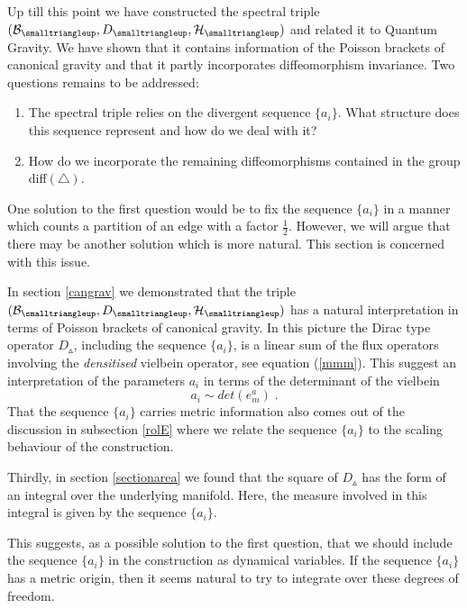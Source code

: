 \documentclass[12pt]{article}
\def\cb{{\cal B}}
\def\ce{{\cal E}}
\def\ch{{\cal H}}
\begin{document}
Up till this point we have constructed the spectral triple $(\cb_{\smalltriangleup},D_{\smalltriangleup},\ch_\smalltriangleup)$ and related it to Quantum Gravity. We have shown that it contains information of the Poisson brackets of canonical gravity and that it partly incorporates diffeomorphism invariance. Two questions remains to be addressed:
\begin{enumerate}
\item
The spectral triple relies on the divergent sequence $\{a_i\}$. What structure does this sequence represent and how do we deal with it?
\item
How do we incorporate the remaining diffeomorphisms contained in the group diff$(\triangle)$.
\end{enumerate}


One solution to the first question would be to fix the sequence $\{a_i\}$ in a manner which counts a partition of an edge with a factor $\frac{1}{2}$. However, we will argue that there may be another solution which is more natural. This section is concerned with this issue.



In section \ref{cangrav} we demonstrated that the triple $(\cb_{\smalltriangleup},D_{\smalltriangleup},\ch_\smalltriangleup)$ has a natural interpretation in terms of Poisson brackets of canonical gravity. In this picture the Dirac type operator $D_{\smalltriangleup}$, including the sequence $\{a_i\}$, is a linear sum of the flux operators involving the {\it densitised} vielbein operator, see equation (\ref{mmm}). This suggest an interpretation of the parameters $a_i$ in terms of the determinant of the vielbein 
\[
  a_i \sim det(e_m^a)\;.
\]
That the sequence $\{a_i\}$ carries metric information also comes out of the discussion in subsection \ref{rolE} where we relate the sequence $\{a_i\}$ to the scaling behaviour of the construction.

Thirdly, in section \ref{sectionarea} we found that the square of $D_{\smalltriangleup}$ has the form of an integral over the underlying manifold. Here, the measure involved in this integral is given by the sequence $\{a_i\}$.

This suggests, as a possible solution to the first question, that we should include the sequence $\{a_i\}$ in the construction as dynamical variables. If the sequence $\{a_i\}$ has a metric origin, then it seems natural to try to integrate over these degrees of freedom.
\end{document}
